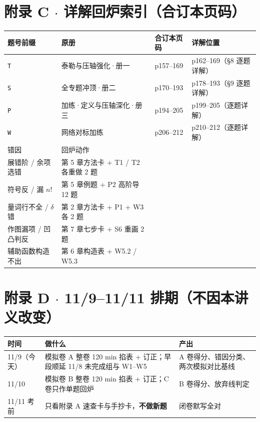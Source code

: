 \documentclass[11pt,a4paper]{ctexart}
\begin{document}
\section*{附录 C $\cdot$ 详解回炉索引（合订本页码）}
{\footnotesize
\begin{longtable}{@{}p{2.1cm}p{4.0cm}p{3.0cm}p{6.1cm}@{}}
\toprule
\textbf{题号前缀} & \textbf{原册} & \textbf{合订本页码} & \textbf{详解位置} \\
\midrule
\texttt{T} & 泰勒与压轴强化·册一 & p157--169 & p162--169（§8 逐题详解） \\
\texttt{S} & 全专题冲顶·册二 & p170--193 & p178--193（§9 逐题详解） \\
\texttt{P} & 加练·定义与压轴深化·册三 & p194--205 & p199--205（逐题详解） \\
\texttt{W} & 网络对标加练 & p206--212 & p210--212（逐题详解） \\
\midrule
错因 & 回炉动作 & & \\
展错阶 / 余项选错 & 第 5 章方法卡 + T1 / T2 各重做 2 题 & & \\
符号反 / 漏 $n!$ & 第 5 章例题 + P2 高阶导 12 题 & & \\
量词行不全 / $\delta$ 错 & 第 2 章方法卡 + P1 + W3 各 2 题 & & \\
作图漏项 / 凹凸判反 & 第 7 章七步卡 + S6 重画 2 题 & & \\
辅助函数构造不出 & 第 6 章构造表 + W5.2 / W5.3 & & \\
\bottomrule
\end{longtable}}

\section*{附录 D $\cdot$ 11/9--11/11 排期（不因本讲义改变）}
{\footnotesize
\begin{longtable}{@{}p{2.1cm}p{6.0cm}p{7.1cm}@{}}
\toprule
\textbf{时间} & \textbf{做什么} & \textbf{产出} \\
\midrule
11/9（今天） & 模拟卷 A 整卷 120 min 掐表 + 订正；早段顺延 11/8 未完成组与 W1--W5 & A 卷得分、错因分类、两次模拟对比基线 \\
11/10 & 模拟卷 B 整卷 120 min 掐表 + 订正；C 卷只作单题回炉 & B 卷得分、放弃线判定 \\
11/11 考前 & 只看附录 A 速查卡与手抄卡，\textbf{不做新题} & 闭卷默写全对 \\
\bottomrule
\end{longtable}}
\end{document}
